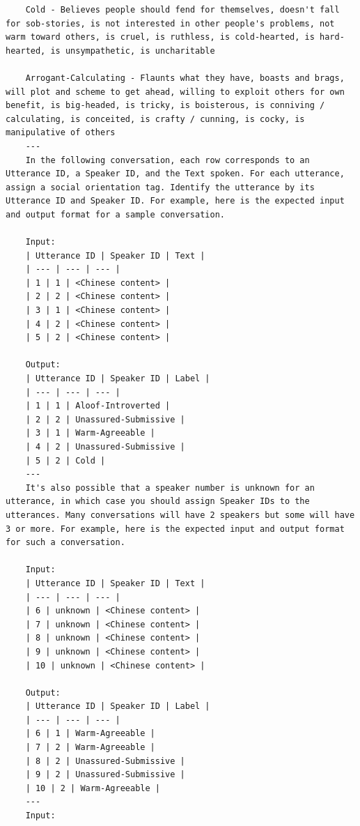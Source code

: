 \documentclass[12pt]{article}
\begin{document}
\begin{lstlisting}
    Cold - Believes people should fend for themselves, doesn't fall for sob-stories, is not interested in other people's problems, not warm toward others, is cruel, is ruthless, is cold-hearted, is hard-hearted, is unsympathetic, is uncharitable
    
    Arrogant-Calculating - Flaunts what they have, boasts and brags, will plot and scheme to get ahead, willing to exploit others for own benefit, is big-headed, is tricky, is boisterous, is conniving / calculating, is conceited, is crafty / cunning, is cocky, is manipulative of others
    ---
    In the following conversation, each row corresponds to an Utterance ID, a Speaker ID, and the Text spoken. For each utterance, assign a social orientation tag. Identify the utterance by its Utterance ID and Speaker ID. For example, here is the expected input and output format for a sample conversation.
    
    Input:
    | Utterance ID | Speaker ID | Text |
    | --- | --- | --- |
    | 1 | 1 | <Chinese content> |
    | 2 | 2 | <Chinese content> |
    | 3 | 1 | <Chinese content> |
    | 4 | 2 | <Chinese content> |
    | 5 | 2 | <Chinese content> |
    
    Output:
    | Utterance ID | Speaker ID | Label |
    | --- | --- | --- |
    | 1 | 1 | Aloof-Introverted |
    | 2 | 2 | Unassured-Submissive |
    | 3 | 1 | Warm-Agreeable |
    | 4 | 2 | Unassured-Submissive |
    | 5 | 2 | Cold |
    ---
    It's also possible that a speaker number is unknown for an utterance, in which case you should assign Speaker IDs to the utterances. Many conversations will have 2 speakers but some will have 3 or more. For example, here is the expected input and output format for such a conversation.
    
    Input:
    | Utterance ID | Speaker ID | Text |
    | --- | --- | --- |
    | 6 | unknown | <Chinese content> |
    | 7 | unknown | <Chinese content> |
    | 8 | unknown | <Chinese content> |
    | 9 | unknown | <Chinese content> |
    | 10 | unknown | <Chinese content> |
    
    Output:
    | Utterance ID | Speaker ID | Label |
    | --- | --- | --- |
    | 6 | 1 | Warm-Agreeable |
    | 7 | 2 | Warm-Agreeable |
    | 8 | 2 | Unassured-Submissive |
    | 9 | 2 | Unassured-Submissive |
    | 10 | 2 | Warm-Agreeable |
    ---
    Input:
\end{lstlisting}
\end{document}
